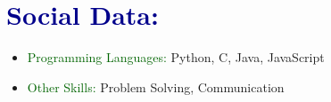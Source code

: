 \documentclass{article}
\begin{document}
\section*{\textcolor{darkblue}{Social Data:}}
\begin{itemize}[label=-, leftmargin=0.5cm]
    \item \textcolor{darkgreen}{Programming Languages:} Python, C, Java, JavaScript
    \item \textcolor{darkgreen}{Other Skills:} Problem Solving, Communication
\end{itemize}
\end{document}
